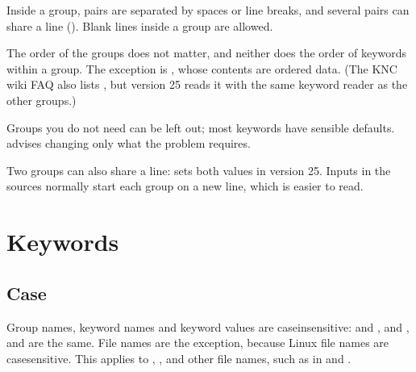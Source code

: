 \documentclass[letterpaper,10pt,english,openany,oneside]{sphinxmanual}
\begin{document}
\sphinxAtStartPar
Inside a group,  pairs are separated by spaces or line breaks, and several pairs can share a line
(). Blank lines inside a group are allowed.



\sphinxAtStartPar
The order of the groups does not matter, and neither does the order of keywords within a group. The exception is
, whose contents are ordered data. (The KNC wiki FAQ also lists , but version 25 reads it with
the same keyword reader as the other groups.)



\sphinxAtStartPar
Groups you do not need can be left out; most keywords have sensible defaults.  advises changing only what
the problem requires.



\sphinxAtStartPar
Two groups can also share a line:  sets both values in version 25.
Inputs in the sources normally start each group on a new line, which is easier to read.




\section{Keywords}
\label{\detokenize{start/input-syntax:keywords}}

\subsection{Case}
\label{\detokenize{start/input-syntax:case}}
\sphinxAtStartPar
Group names, keyword names and keyword values are case\sphinxhyphen{}insensitive:  and ,  and
,  and  are the same. File names are the exception, because Linux file
names are case\sphinxhyphen{}sensitive. This applies to , ,  and other file names, such as  in
 and .
\end{document}
